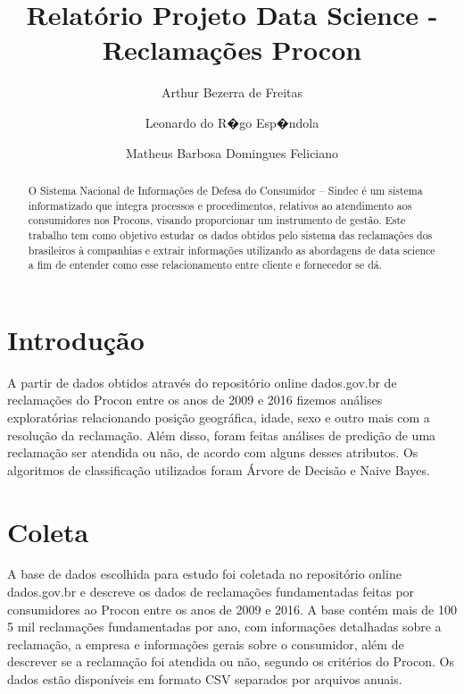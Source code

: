 \documentclass[review]{elsarticle}
\begin{document}
\begin{frontmatter}

\title{Relatório Projeto Data Science - Reclamações Procon}


\author{Arthur Bezerra de Freitas}
\author{Leonardo do R�go Esp�ndola}
\author{Matheus Barbosa Domingues Feliciano}
\address{Universidade Federal de Pernambuco � Centro de Inform�tica
\linebreak Caixa Postal 7.851 � 50.732-970 � Recife, PE � Brasil
\linebreak abf2@cin.ufpe.br, lre@cin.ufpe.br, mbdf@cin.ufpe.br}

\begin{abstract}
    O Sistema Nacional de Informações de Defesa do Consumidor – Sindec é um sistema informatizado que integra processos e procedimentos, relativos ao atendimento aos consumidores nos Procons, visando proporcionar um instrumento de gestão. Este trabalho tem como objetivo estudar os dados obtidos pelo sistema das reclamações dos brasileiros à companhias e extrair informações utilizando as abordagens de data science a fim de entender como esse relacionamento entre cliente e fornecedor se dá.
\end{abstract}

\end{frontmatter}

\linenumbers

\section{Introdução}
A partir de dados obtidos através do repositório online dados.gov.br de reclamações do Procon entre os anos de 2009 e 2016 fizemos análises exploratórias relacionando posição geográfica, idade, sexo e outro mais com a resolução da reclamação. Além disso, foram feitas análises de predição de uma reclamação ser atendida ou não, de acordo com alguns desses atributos. Os algoritmos de classificação utilizados foram Árvore de Decisão e Naive Bayes.

\section{Coleta}
A base de dados escolhida para estudo foi coletada no repositório online dados.gov.br e descreve os dados de reclamações fundamentadas feitas por consumidores ao Procon entre os anos de 2009 e 2016. A base contém mais de 100 5 mil reclamações fundamentadas por ano, com informações detalhadas sobre a reclamação, a empresa e informações gerais sobre o consumidor, além de descrever se a reclamação foi atendida ou não, segundo os critérios do Procon. Os dados estão disponíveis em formato CSV separados por arquivos anuais. 
\end{document}
